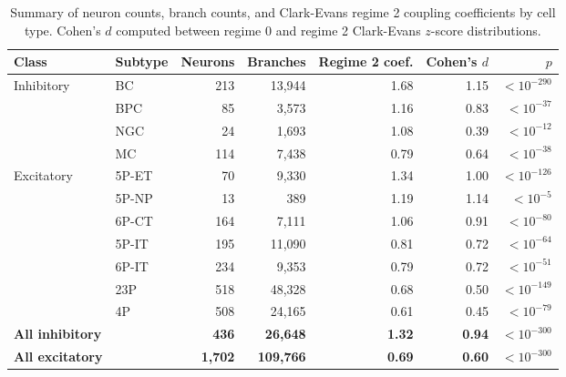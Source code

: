 \documentclass[11pt]{article}
\begin{document}
\begin{table}[H]
\centering
\caption{Summary of neuron counts, branch counts, and Clark-Evans regime 2 coupling coefficients by cell type. Cohen's $d$ computed between regime 0 and regime 2 Clark-Evans $z$-score distributions.}
\label{tab:summary}
\begin{tabular}{llrrrrr}
\toprule
Class & Subtype & Neurons & Branches & Regime 2 coef. & Cohen's $d$ & $p$ \\
\midrule
Inhibitory & BC & 213 & 13,944 & 1.68 & 1.15 & $< 10^{-290}$ \\
 & BPC & 85 & 3,573 & 1.16 & 0.83 & $< 10^{-37}$ \\
 & NGC & 24 & 1,693 & 1.08 & 0.39 & $< 10^{-12}$ \\
 & MC & 114 & 7,438 & 0.79 & 0.64 & $< 10^{-38}$ \\
\midrule
Excitatory & 5P-ET & 70 & 9,330 & 1.34 & 1.00 & $< 10^{-126}$ \\
 & 5P-NP & 13 & 389 & 1.19 & 1.14 & $< 10^{-5}$ \\
 & 6P-CT & 164 & 7,111 & 1.06 & 0.91 & $< 10^{-80}$ \\
 & 5P-IT & 195 & 11,090 & 0.81 & 0.72 & $< 10^{-64}$ \\
 & 6P-IT & 234 & 9,353 & 0.79 & 0.72 & $< 10^{-51}$ \\
 & 23P & 518 & 48,328 & 0.68 & 0.50 & $< 10^{-149}$ \\
 & 4P & 508 & 24,165 & 0.61 & 0.45 & $< 10^{-79}$ \\
\midrule
\textbf{All inhibitory} & & \textbf{436} & \textbf{26,648} & \textbf{1.32} & \textbf{0.94} & $< 10^{-300}$ \\
\textbf{All excitatory} & & \textbf{1,702} & \textbf{109,766} & \textbf{0.69} & \textbf{0.60} & $< 10^{-300}$ \\
\bottomrule
\end{tabular}
\end{table}
\end{document}
